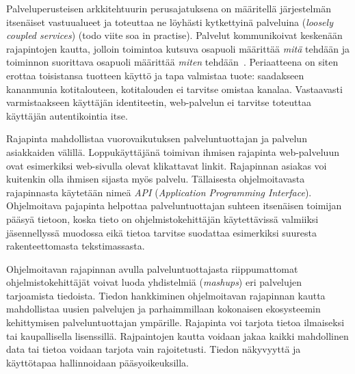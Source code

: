 \documentclass[finnish,gradu]{tktltiki}
\begin{document}
  Palveluperusteisen arkkitehtuurin perusajatuksena on määritellä järjestelmän itsenäiset vastuualueet ja toteuttaa ne löyhästi kytkettyinä palveluina (\emph{loosely coupled services}) (todo viite soa in practise). Palvelut kommunikoivat keskenään rajapintojen kautta, jolloin toimintoa kutsuva osapuoli määrittää \emph{mitä} tehdään ja toiminnon suorittava osapuoli määrittää \emph{miten} tehdään~\cite{federated_auth_case_2008}. Periaatteena on siten erottaa toisistansa tuotteen käyttö ja tapa valmistaa tuote: saadakseen kananmunia kotitalouteen, kotitalouden ei tarvitse omistaa kanalaa. Vastaavasti varmistaakseen käyttäjän identiteetin, web-palvelun ei tarvitse toteuttaa käyttäjän autentikointia itse.


  Rajapinta mahdollistaa vuorovaikutuksen palveluntuottajan ja palvelun asiakkaiden välillä. Loppukäyttäjänä toimivan ihmisen rajapinta web-palveluun ovat esimerkiksi web-sivulla olevat klikattavat linkit. Rajapinnan asiakas voi kuitenkin olla ihmisen sijasta myös palvelu. Tällaisesta ohjelmoitavasta rajapinnasta käytetään nimeä \emph{API} (\emph{Application Programming Interface}). Ohjelmoitava pajapinta helpottaa palveluntuottajan suhteen itsenäisen toimijan pääsyä tietoon, koska tieto on ohjelmistokehittäjän käytettävissä valmiiksi jäsennellyssä muodossa eikä tietoa tarvitse suodattaa esimerkiksi suuresta rakenteettomasta tekstimassasta.

  Ohjelmoitavan rajapinnan avulla palveluntuottajasta riippumattomat ohjelmistokehittäjät voivat luoda yhdistelmiä (\emph{mashups}) eri palvelujen tarjoamista tiedoista. Tiedon hankkiminen ohjelmoitavan rajapinnan kautta mahdollistaa uusien palvelujen ja parhaimmillaan kokonaisen ekosysteemin kehittymisen palveluntuottajan ympärille. Rajapinta voi tarjota tietoa ilmaiseksi tai kaupallisella lisenssillä. Rajpaintojen kautta voidaan jakaa kaikki mahdollinen data tai tietoa voidaan tarjota vain rajoitetusti. Tiedon näkyvyyttä ja käyttötapaa hallinnoidaan pääsyoikeuksilla.
\end{document}
